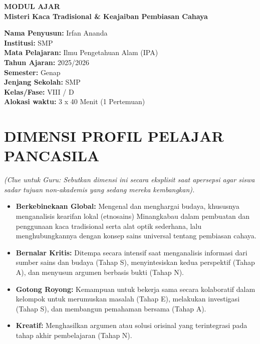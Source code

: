 \documentclass[12pt,a4paper]{article}
\begin{document}
\begin{center}
{\Huge\textbf{MODUL AJAR}}\\
\vspace{0.5cm}
{\Large\textbf{Misteri Kaca Tradisional \& Keajaiban Pembiasan Cahaya}}
\end{center}

\vspace{1cm}

\begin{tcolorbox}[colback=white,colframe=black,boxrule=1pt]
\textbf{Nama Penyusun:} Irfan Ananda\\
\textbf{Institusi:} SMP\\
\textbf{Mata Pelajaran:} Ilmu Pengetahuan Alam (IPA)\\
\textbf{Tahun Ajaran:} 2025/2026\\
\textbf{Semester:} Genap\\
\textbf{Jenjang Sekolah:} SMP\\
\textbf{Kelas/Fase:} VIII / D\\
\textbf{Alokasi waktu:} 3 x 40 Menit (1 Pertemuan)
\end{tcolorbox}

\section{DIMENSI PROFIL PELAJAR PANCASILA}
\textit{(Clue untuk Guru: Sebutkan dimensi ini secara eksplisit saat apersepsi agar siswa sadar tujuan non-akademis yang sedang mereka kembangkan).}

\begin{itemize}
\item \textbf{Berkebinekaan Global:} Mengenal dan menghargai budaya, khususnya menganalisis kearifan lokal (etnosains) Minangkabau dalam pembuatan dan penggunaan kaca tradisional serta alat optik sederhana, lalu menghubungkannya dengan konsep sains universal tentang pembiasan cahaya.
\item \textbf{Bernalar Kritis:} Ditempa secara intensif saat menganalisis informasi dari sumber sains dan budaya (Tahap S), menyintesiskan kedua perspektif (Tahap A), dan menyusun argumen berbasis bukti (Tahap N).
\item \textbf{Gotong Royong:} Kemampuan untuk bekerja sama secara kolaboratif dalam kelompok untuk merumuskan masalah (Tahap E), melakukan investigasi (Tahap S), dan membangun pemahaman bersama (Tahap A).
\item \textbf{Kreatif:} Menghasilkan argumen atau solusi orisinal yang terintegrasi pada tahap akhir pembelajaran (Tahap N).
\end{itemize}
\end{document}
